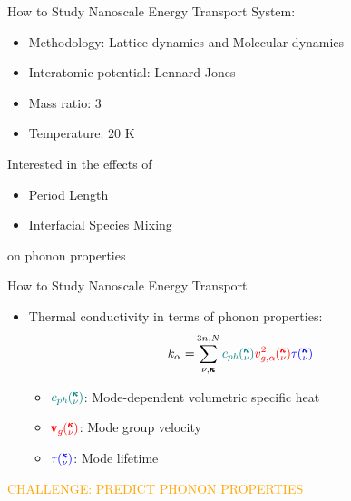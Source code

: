 \documentclass{beamer}
\newcommand{\kv}{\mspace{-4.0mu}\left(\mspace{-8.0mu}
\begin{smallmatrix}&\pmb{\kappa} \\&\nu\end{smallmatrix}
\mspace{-3.0mu}\right)}
\begin{document}
\begin{frame}{How to Study Nanoscale Energy Transport}
System:
\begin{itemize}
\item Methodology: Lattice dynamics and Molecular dynamics
\item Interatomic potential: Lennard-Jones
\item Mass ratio: 3
\item Temperature: 20 K
\end{itemize}
\newline
\newline
Interested in the effects of
\begin{itemize}
\item Period Length
\item Interfacial Species Mixing
\end{itemize}
on phonon properties
\end{frame}

\begin{frame}{How to Study Nanoscale Energy Transport}
\begin{itemize}
\item Thermal conductivity in terms of phonon properties:
\begin{equation}\label{EQ:M:conductivity}
\begin{split}
k_{\mathbf{\alpha}}=&\sum_{\nu,\pmb{\kappa}}^{3n,N} \textcolor{teal}{c_{ph}\kv}
\textcolor{red}{v^{2}_{g,\mathbf{\alpha}}\kv} \textcolor{blue}{\tau\kv}
\end{split}
\end{equation}
\begin{itemize}
\item $\textcolor{teal}{c_{ph}\kv}$: Mode-dependent volumetric specific heat
\item $\textcolor{red}{\pmb{\mathrm{v}}_{g}\kv}$: Mode group velocity
\item $\textcolor{blue}{\tau\kv}$: Mode lifetime
\end{itemize}

\end{itemize}
\textcolor{orange}{CHALLENGE: PREDICT PHONON PROPERTIES}
\end{frame}


\end{document}
